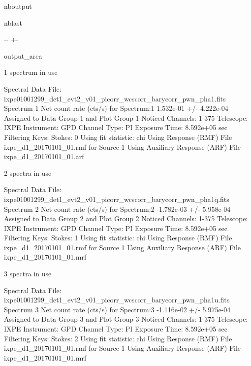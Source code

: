 \documentclass[letterpaper,10pt,english]{sphinxmanual}
\newlength\nbsphinxcodecellspacing
\begin{document}
\begin{sphinxuseclass}{nboutput}
\begin{sphinxuseclass}{nblast}
{

\kern-\sphinxverbatimsmallskipamount\kern-\baselineskip
\kern+\FrameHeightAdjust\kern-\fboxrule
\vspace{\nbsphinxcodecellspacing}

\begin{sphinxuseclass}{output_area}
\begin{sphinxuseclass}{}


\begin{sphinxVerbatim}
1 spectrum  in use

Spectral Data File: ixpe01001299\_det1\_evt2\_v01\_picorr\_wcscorr\_barycorr\_pwn\_pha1.fits  Spectrum 1
Net count rate (cts/s) for Spectrum:1  1.532e-01 +/- 4.222e-04
 Assigned to Data Group 1 and Plot Group 1
  Noticed Channels:  1-375
  Telescope: IXPE Instrument: GPD  Channel Type: PI
  Exposure Time: 8.592e+05 sec
  Filtering Keys:
    Stokes: 0
 Using fit statistic: chi
 Using Response (RMF) File            ixpe\_d1\_20170101\_01.rmf for Source 1
 Using Auxiliary Response (ARF) File  ixpe\_d1\_20170101\_01.arf



2 spectra  in use

Spectral Data File: ixpe01001299\_det1\_evt2\_v01\_picorr\_wcscorr\_barycorr\_pwn\_pha1q.fits  Spectrum 2
Net count rate (cts/s) for Spectrum:2  -1.782e-03 +/- 5.958e-04
 Assigned to Data Group 2 and Plot Group 2
  Noticed Channels:  1-375
  Telescope: IXPE Instrument: GPD  Channel Type: PI
  Exposure Time: 8.592e+05 sec
  Filtering Keys:
    Stokes: 1
 Using fit statistic: chi
 Using Response (RMF) File            ixpe\_d1\_20170101\_01.rmf for Source 1
 Using Auxiliary Response (ARF) File  ixpe\_d1\_20170101\_01.mrf


3 spectra  in use

Spectral Data File: ixpe01001299\_det1\_evt2\_v01\_picorr\_wcscorr\_barycorr\_pwn\_pha1u.fits  Spectrum 3
Net count rate (cts/s) for Spectrum:3  -1.116e-02 +/- 5.975e-04
 Assigned to Data Group 3 and Plot Group 3
  Noticed Channels:  1-375
  Telescope: IXPE Instrument: GPD  Channel Type: PI
  Exposure Time: 8.592e+05 sec
  Filtering Keys:
    Stokes: 2
 Using fit statistic: chi
 Using Response (RMF) File            ixpe\_d1\_20170101\_01.rmf for Source 1
 Using Auxiliary Response (ARF) File  ixpe\_d1\_20170101\_01.mrf

\end{sphinxVerbatim}



\end{sphinxuseclass}
\end{sphinxuseclass}
}

\end{sphinxuseclass}
\end{sphinxuseclass}
\end{document}

